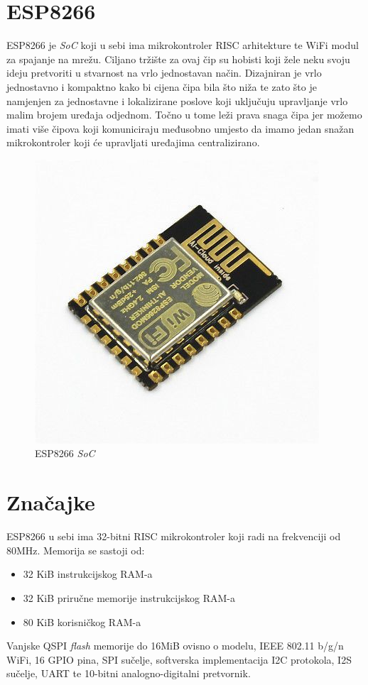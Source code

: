 \documentclass[times, utf8, zavrsni]{fer}
\begin{document}
\section{ESP8266}
ESP8266 je \textit{SoC} koji u sebi ima mikrokontroler RISC arhitekture te WiFi modul za spajanje na mrežu.
Ciljano tržište za ovaj čip su hobisti koji žele neku svoju ideju pretvoriti u stvarnost na vrlo jednostavan način.
Dizajniran je vrlo jednostavno i kompaktno kako bi cijena čipa bila što niža te zato što je namjenjen za jednostavne i lokalizirane poslove koji uključuju upravljanje vrlo malim brojem uređaja odjednom.
Točno u tome leži prava snaga čipa jer možemo imati više čipova koji komuniciraju međusobno umjesto da imamo jedan snažan mikrokontroler koji će upravljati uređajima centralizirano.

\begin{figure}[h]
    \centering
    \includegraphics[scale=0.5]{esp8266.jpg}
    \caption{ESP8266 \textit{SoC}}
\end{figure}

\section{Značajke}
ESP8266 u sebi ima 32-bitni RISC mikrokontroler koji radi na frekvenciji od 80MHz.
Memorija se sastoji od:
\begin{itemize}
    \item 32 KiB instrukcijskog RAM-a
    \item 32 KiB priručne memorije instrukcijskog RAM-a
    \item 80 KiB korisničkog RAM-a
\end{itemize}
Vanjske QSPI \textit{flash} memorije do 16MiB ovisno o modelu, IEEE 802.11 b/g/n WiFi, 16 GPIO pina, SPI sučelje, softverska implementacija I2C protokola, I2S sučelje, UART te 10-bitni analogno-digitalni pretvornik.
\end{document}
